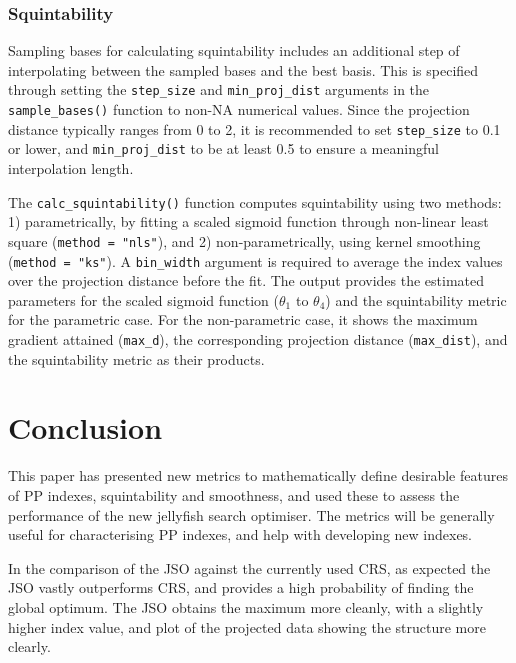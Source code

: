 \documentclass[
  12pt,
]{interact}
\theoremstyle{plain}
\begin{document}
\hypertarget{squintability}{%
\subsubsection{Squintability}\label{squintability}}

Sampling bases for calculating squintability includes an additional step
of interpolating between the sampled bases and the best basis. This is
specified through setting the \texttt{step\_size} and
\texttt{min\_proj\_dist} arguments in the \texttt{sample\_bases()}
function to non-NA numerical values. Since the projection distance
typically ranges from 0 to 2, it is recommended to set
\texttt{step\_size} to 0.1 or lower, and \texttt{min\_proj\_dist} to be
at least 0.5 to ensure a meaningful interpolation length.

The \texttt{calc\_squintability()} function computes squintability using
two methods: 1) parametrically, by fitting a scaled sigmoid function
through non-linear least square (\texttt{method\ =\ "nls"}), and 2)
non-parametrically, using kernel smoothing (\texttt{method\ =\ "ks"}). A
\texttt{bin\_width} argument is required to average the index values
over the projection distance before the fit. The output provides the
estimated parameters for the scaled sigmoid function (\(\theta_1\) to
\(\theta_4\)) and the squintability metric for the parametric case. For
the non-parametric case, it shows the maximum gradient attained
(\texttt{max\_d}), the corresponding projection distance
(\texttt{max\_dist}), and the squintability metric as their products.

\hypertarget{sec-conclusion}{%
\section{Conclusion}\label{sec-conclusion}}

This paper has presented new metrics to mathematically define desirable
features of PP indexes, squintability and smoothness, and used these to
assess the performance of the new jellyfish search optimiser. The
metrics will be generally useful for characterising PP indexes, and help
with developing new indexes.

In the comparison of the JSO against the currently used CRS, as expected
the JSO vastly outperforms CRS, and provides a high probability of
finding the global optimum. The JSO obtains the maximum more cleanly,
with a slightly higher index value, and plot of the projected data
showing the structure more clearly.
\end{document}

